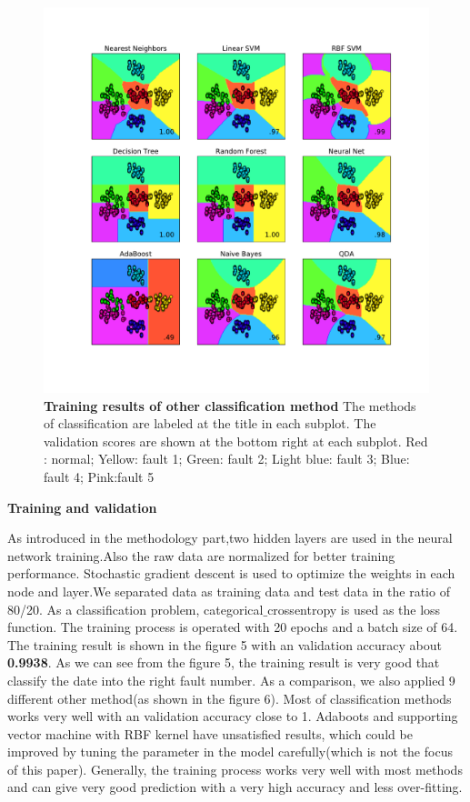 \documentclass[fleqn,11pt]{wlscirep}
\begin{document}
\begin{figure}[h]
    \centering
    \includegraphics[width=12cm]{figure6.pdf}
    \caption{
    \textbf{Training results of other classification method} The methods of classification are labeled at the title in each subplot. The validation scores are shown at the bottom right at each subplot.  Red : normal; Yellow: fault 1; Green: fault 2; Light blue: fault 3;  Blue: fault 4; Pink:fault 5 }
    \label{fig:1}
\end{figure}
\textbf{Training and validation}

As introduced in the methodology part,two hidden layers are used in the neural network training.Also the raw data are normalized for better training performance.  Stochastic gradient descent is used to optimize the weights in each node and layer.We separated data as training data and test data in the ratio of 80/20.  As a classification problem, categorical$\_$crossentropy is used as the loss function. The training process is operated with 20 epochs and a batch size of 64. The training  result is shown in the figure 5 with an validation accuracy about \textbf{0.9938}. As we can see from the figure 5, the  training result is very good that classify the date into the right fault number. As a comparison, we also applied 9 different other method(as shown in the figure 6). Most of classification methods works very well with an validation accuracy close to 1. Adaboots and supporting vector machine with RBF kernel have unsatisfied results, which could be improved by tuning the parameter in the model carefully(which is not the focus of this paper). Generally, the training process works very well with most  methods and can give very good prediction with a very high accuracy and less over-fitting.
\end{document}
